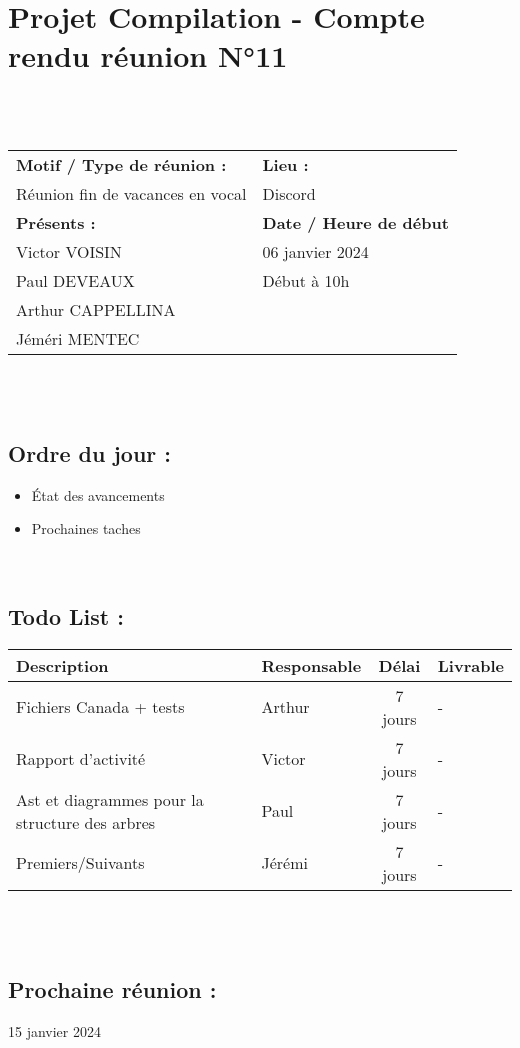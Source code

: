 \documentclass{article}
\begin{document}
\section*{Projet Compilation - Compte rendu réunion N°11}
~\\\\

\begin{tabular}{|p{7cm}|p{6cm}|}
    \hline
    \textbf{Motif / Type de réunion :}
    & \textbf{Lieu :}
    \\
    Réunion fin de vacances en vocal
    &
    Discord
    \\ \hline
    \textbf{Présents :}
    &
    \textbf{Date / Heure de début}
    \\
    Victor VOISIN &  06 janvier 2024\\
    Paul DEVEAUX & Début à 10h\\
    Arthur CAPPELLINA & \\
    Jéméri MENTEC &
    \\ \hline
\end{tabular}
\\\\

\subsection*{Ordre du jour :}
\begin{itemize}
    \item{État des avancements}
    \item{Prochaines taches}
\end{itemize}
~

\subsection*{Todo List :}
\renewcommand{\arraystretch}{1.5}
\begin{tabular}{|p{5cm}|l|c|p{4.5cm}|}
    \hline
    Description & Responsable & Délai & Livrable\\ 
    \hline
    Fichiers Canada + tests & Arthur & 7 jours & - \\
    Rapport d'activité  & Victor & 7 jours & - \\
    Ast et diagrammes pour la structure des arbres & Paul & 7 jours & - \\
    Premiers/Suivants & Jérémi & 7 jours & - \\
    \hline
\end{tabular}
\\\\

\subsection*{Prochaine réunion :} 15 janvier 2024
\end{document}
